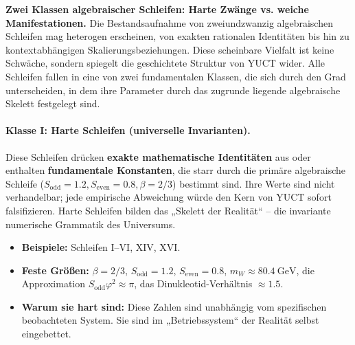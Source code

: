 \documentclass[12pt,a4paper]{article}
\begin{document}
	\vspace{0.5cm}
	\noindent
	\textbf{Zwei Klassen algebraischer Schleifen: Harte Zwänge vs. weiche Manifestationen.}
	Die Bestandsaufnahme von zweiundzwanzig algebraischen Schleifen mag heterogen erscheinen, von exakten rationalen Identitäten bis hin zu kontextabhängigen Skalierungsbeziehungen. Diese scheinbare Vielfalt ist keine Schwäche, sondern spiegelt die geschichtete Struktur von YUCT wider. Alle Schleifen fallen in eine von zwei fundamentalen Klassen, die sich durch den Grad unterscheiden, in dem ihre Parameter durch das zugrunde liegende algebraische Skelett festgelegt sind.
	
	\paragraph{Klasse I: Harte Schleifen (universelle Invarianten).}
	Diese Schleifen drücken \textbf{exakte mathematische Identitäten} aus oder enthalten \textbf{fundamentale Konstanten}, die starr durch die primäre algebraische Schleife (\(S_{\mathrm{odd}}=1.2, S_{\mathrm{even}}=0.8, \beta=2/3\)) bestimmt sind. Ihre Werte sind nicht verhandelbar; jede empirische Abweichung würde den Kern von YUCT sofort falsifizieren. Harte Schleifen bilden das „Skelett der Realität“ – die invariante numerische Grammatik des Universums.
	\begin{itemize}
		\item \textbf{Beispiele:} Schleifen I--VI, XIV, XVI.
		\item \textbf{Feste Größen:} \(\beta = 2/3\), \(S_{\mathrm{odd}}=1.2\), \(S_{\mathrm{even}}=0.8\), \(m_W \approx 80.4\ \text{GeV}\), die Approximation \(S_{\mathrm{odd}}\varphi^2 \approx \pi\), das Dinukleotid-Verhältnis \(\approx 1.5\).
		\item \textbf{Warum sie hart sind:} Diese Zahlen sind unabhängig vom spezifischen beobachteten System. Sie sind im „Betriebssystem“ der Realität selbst eingebettet.
	\end{itemize}
	
\end{document}
